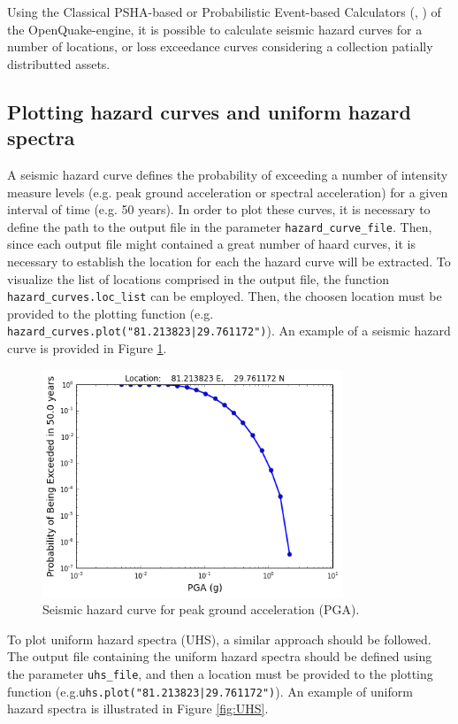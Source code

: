Using the Classical PSHA-based or Probabilistic Event-based Calculators (\cite{SilvaEtAl2014a}, \cite{PaganiEtAl2014a}) of the OpenQuake-engine, it is possible to calculate seismic hazard curves for a number of locations, or loss exceedance curves considering a collection patially distributted assets.

\subsection{Plotting hazard curves and uniform hazard spectra}
\label{subsec:plot-hazard_curves}
A seismic hazard curve defines the probability of exceeding a number of intensity measure levels (e.g. peak ground acceleration or spectral acceleration) for a given interval of time (e.g. 50 years). In order to plot these curves, it is necessary to define the path to the output file in the parameter \verb=hazard_curve_file=. Then, since each output file might contained a great number of haard curves, it is necessary to establish the location for each the hazard curve will be extracted. To visualize the list of locations comprised in the output file, the function \verb=hazard_curves.loc_list= can be employed. Then, the choosen location must be provided to the plotting function (e.g. \verb=hazard_curves.plot("81.213823|29.761172")=). An example of a seismic hazard curve is provided in Figure \ref{fig:hazard_curve}.\\

\begin{figure}[htb]
  \centering
      \includegraphics[width=9cm]{figures/hazard_curve.png}
  \caption{Seismic hazard curve for peak ground acceleration (PGA).}
  \label{fig:hazard_curve}
\end{figure}

To plot uniform hazard spectra (UHS), a similar approach should be followed. The output file containing the uniform hazard spectra should be defined using the parameter \verb=uhs_file=, and then a location must be provided to the plotting function (e.g.\verb=uhs.plot("81.213823|29.761172")=). An example of uniform hazard spectra is illustrated in Figure \ref{fig:UHS}.

